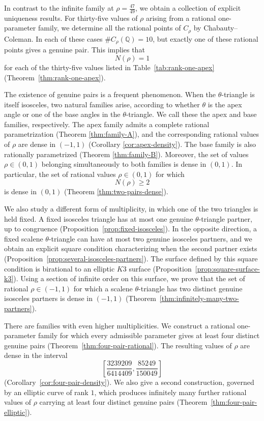 \documentclass[11pt]{amsart}
\theoremstyle{plain}
\theoremstyle{remark}
\theoremstyle{plain}
\newcommand{\Q}{\mathbb{Q}}
\begin{document}
In contrast to the infinite family at
$\rho=\frac{47}{49}$, we obtain a collection of explicit uniqueness
results. For thirty-five values of $\rho$ arising from a rational
one-parameter family, we determine all the rational points of
$C_\rho$ by Chabauty--Coleman. In each of these cases
$\#C_\rho(\Q)=10$, but exactly one of these rational points gives a
genuine pair. This implies that
\[
N(\rho)=1
\]
for each of the thirty-five values listed in
Table~\ref{tab:rank-one-apex} (Theorem~\ref{thm:rank-one-apex}).

The existence of genuine pairs is a frequent phenomenon. When the
$\theta$-triangle is itself isosceles, two natural families arise,
according to whether $\theta$ is the apex angle or one of the base
angles in the $\theta$-triangle. We call these the apex and base families, respectively. The
apex family admits a complete rational parametrization (Theorem \ref{thm:family-A}), and the
corresponding rational values of $\rho$ are dense in $(-1,1)$ (Corollary \ref{cor:apex-density}).
The base family is also rationally parametrized (Theorem \ref{thm:family-B}). Moreover, the set of
values $\rho\in(0,1)$ belonging simultaneously to both families is
dense in $(0,1)$. In particular, the set of rational values
$\rho\in(0,1)$ for which
\[
N(\rho)\geq2
\]
is dense in $(0,1)$ (Theorem \ref{thm:two-pairs-dense}).

We also study a different form of multiplicity, in which one of the
two triangles is held fixed. A fixed isosceles triangle has at most one
genuine $\theta$-triangle partner, up to congruence (Proposition~\ref{prop:fixed-isosceles}). In the opposite
direction, a fixed scalene $\theta$-triangle can have at most two
genuine isosceles partners, and we obtain an explicit square condition
characterizing when the second partner exists (Proposition~\ref{prop:several-isosceles-partners}). The surface defined by
this square condition is birational to an elliptic $K3$ surface (Proposition~\ref{prop:square-surface-k3}). Using
a section of infinite order on this surface, we prove that the set of
rational $\rho\in(-1,1)$ for which a scalene $\theta$-triangle has two
distinct genuine isosceles partners is dense in $(-1,1)$ (Theorem~\ref{thm:infinitely-many-two-partners}).

There are families with even
 higher multiplicities. We construct a
rational one-parameter family for which every admissible parameter
gives at least four distinct genuine pairs (Theorem~\ref{thm:four-pair-rational}). The resulting values of
$\rho$ are dense in the interval
\[
\left[
\frac{3239209}{6414409},
\frac{85249}{150049}
\right]
\]
(Corollary~\ref{cor:four-pair-density}).
We also give a second construction, governed by an elliptic curve of
rank $1$, which produces infinitely many further rational values of
$\rho$ carrying at least four distinct genuine pairs (Theorem~\ref{thm:four-pair-elliptic}).
\end{document}
